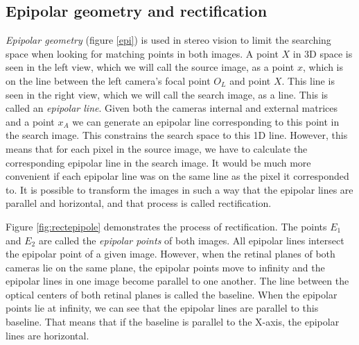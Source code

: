 \documentclass[a4paper]{article}
\begin{document}
\subsection{Epipolar geometry and rectification}
\label{recttheory}
\emph{Epipolar geometry} (figure \ref{epi}) is used in stereo vision to limit
the searching space when looking for matching points in both images. A point $X$
in 3D space is seen in the left view, which we will call the source image, as a
point $x$, which is on the line between the left camera's focal point $O_L$ and
point $X$.  This line is seen in the right view, which we will call the search
image, as a line. This is called an \emph{epipolar line}. Given both the cameras
internal and external matrices and a point $x_A$ we can generate an epipolar
line corresponding to this point in the search image. This constrains the search
space to this 1D line. However, this means that for each pixel in the source
image, we have to calculate the corresponding epipolar line in the search image.
It would be much more convenient if each epipolar line was on the same line as
the pixel it corresponded to. It is possible to transform the images in such a
way that the epipolar lines are parallel and horizontal, and that process is
called rectification.

Figure \ref{fig:rectepipole} demonstrates the process of rectification.  The
points $E_{1}$ and $E_{2}$ are called the \emph{epipolar points} of both
images. All epipolar lines intersect the epipolar point of a given image.
However, when the retinal planes of both cameras lie on the same plane, the
epipolar points move to infinity and the epipolar lines in one image become
parallel to one another. The line between the optical centers of both retinal
planes is called the baseline. When the epipolar points lie at infinity, we can
see that the epipolar lines are parallel to this baseline. That means that if
the baseline is parallel to the X-axis, the epipolar lines are horizontal.
\end{document}
